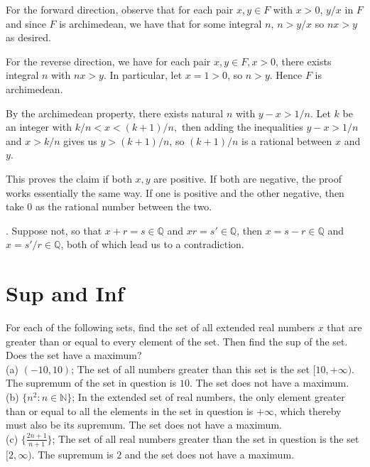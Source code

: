 \documentclass[12pt]{book}
\newenvironment{exercise}[2][Exercise]{\begin{trivlist}
\item[\hskip \labelsep {\bfseries #1}\hskip \labelsep {\bfseries #2.}]}{\end{trivlist}}
\begin{document}
\begin{exercise}{1.4.6}
For the forward direction, observe that for each pair $x, y \in F$ with $x > 0$, $y/x$ in $F$ and since $F$ is archimedean, we have that for some integral $n$, $n > y/x$ so $nx > y$ as desired.

For the reverse direction, we have for each pair $x, y \in F, x>0$, there exists integral $n$ with $nx > y$. In particular, let $x = 1 > 0$, so $n > y$. Hence $F$ is archimedean.
\end{exercise}

\begin{exercise}{1.4.7}
By the archimedean property, there exists natural $n$ with $y-x > 1/n$. Let $k$ be an integer with $k/n < x < (k+1)/n,$ then adding the inequalities $y-x > 1/n$ and $x > k/n$ gives us $y > (k+1)/n$, so $(k+1)/n$ is a rational between $x$ and $y$. 

This proves the claim if both $x,y$ are positive. If both are negative, the proof works essentially the same way. If one is positive and the other negative, then take $0$ as the rational number between the two. 
\end{exercise}

\begin{exercise}{1.4.8}. 
Suppose not, so that $x + r = s \in \mathbb{Q}$ and $xr = s' \in \mathbb{Q}$, then $x = s-r \in \mathbb{Q}$ and $x = s'/r \in \mathbb{Q}$, both of which lead us to a contradiction.
\end{exercise}

\section{Sup and Inf}

\begin{exercise}{1.5.1}
For each of the following sets, find the set of all extended real numbers $x$ that are greater than or equal to every element of the set. Then find the sup of the set. Does the set have a maximum? \\
(a) $(-10, 10)$; The set of all numbers greater than this set is the set $[10, +\infty)$. The supremum of the set in question is $10$. The set does not have a maximum.\\
(b) $\{n^2 : n \in \mathbb{N}\}$; In the extended set of real numbers, the only element greater than or equal to all the elements in the set in question is $+\infty$, which thereby must also be its supremum. The set does not have a maximum.\\
(c) $\{ \frac{2n+1}{n+1}\}$; The set of all real numbers greater than the set in question is the set $[2,\infty)$. The supremum is $2$ and the set does not have a maximum.
\end{exercise}
\end{document}
